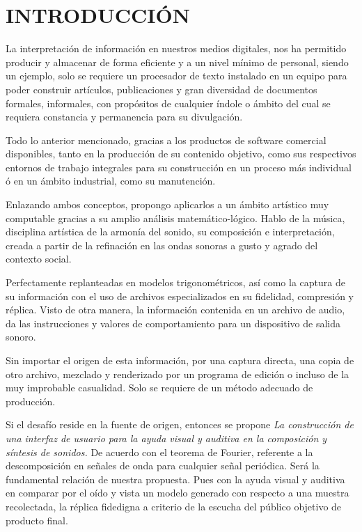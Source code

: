 \documentclass{book}
\begin{document}
	\section*{INTRODUCCIÓN}
	La interpretación de información en nuestros medios digitales, nos ha permitido producir y almacenar de forma eficiente y a un nivel mínimo de personal, siendo un ejemplo, solo se requiere un procesador de texto instalado en un equipo para poder construir artículos, publicaciones y gran diversidad de documentos formales, informales, con propósitos de cualquier índole o ámbito del cual se requiera constancia y permanencia para su divulgación.\par
	Todo lo anterior mencionado, gracias a los productos de software comercial disponibles, tanto en la producción de su contenido objetivo, como sus respectivos entornos de trabajo integrales para su construcción en un proceso más individual ó en un ámbito industrial, como su manutención.\par
	Enlazando ambos conceptos, propongo aplicarlos a un ámbito artístico muy computable gracias a su amplio análisis matemático-lógico. Hablo de la música, disciplina artística de la armonía del sonido, su composición e interpretación, creada a partir de la refinación en las ondas sonoras a gusto y agrado del contexto social.\par 
	Perfectamente replanteadas en modelos trigonométricos, así como la captura de su información con el uso de archivos especializados en su fidelidad, compresión y réplica.
	Visto de otra manera, la información contenida en un archivo de audio, da las instrucciones y valores de comportamiento para un dispositivo de salida sonoro.\par 
	Sin importar el origen de esta información, por una captura directa, una copia de otro archivo, mezclado y renderizado por un programa de edición o incluso de la muy improbable casualidad. Solo se requiere de un método adecuado de producción.\par
	Si el desafío reside en la fuente de origen, entonces se propone \emph{La construcción de una interfaz de usuario para la ayuda visual y auditiva en la composición y síntesis de sonidos.}
	De acuerdo con el teorema de Fourier, referente a la descomposición en señales de onda para cualquier señal periódica. Será la fundamental relación de nuestra propuesta. Pues con la ayuda visual y auditiva en comparar por el oído y vista un modelo generado con respecto a una muestra recolectada, la réplica fidedigna a criterio de la escucha del público objetivo de producto final.\par 
\end{document}

